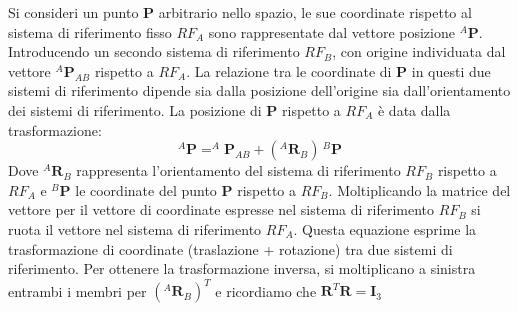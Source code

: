 \documentclass[11pt, a4paper]{report}
\begin{document}
\begin{center}
\end{center}
Si consideri un punto \textbf{P} arbitrario nello spazio, le sue coordinate rispetto al sistema di riferimento fisso $RF_{A}$ sono  rappresentate dal vettore posizione $^{A}\mathbf{P}$. Introducendo un secondo sistema di riferimento $RF_{B}$, con origine individuata dal vettore $^{A}\mathbf{P}_{AB}$ rispetto a $RF_{A}$. La relazione tra le coordinate di \textbf{P} in questi due sistemi di riferimento dipende sia dalla posizione dell'origine sia dall'orientamento dei sistemi di riferimento. La posizione di \textbf{P} rispetto a $RF_{A}$ è data dalla trasformazione:
\[
    ^{A}\mathbf{P} = ^{A}\mathbf{P}_{AB} + ({}^{A}\mathbf{R}_{B}) \, {}^{B}\mathbf{P}
\]
Dove ${}^{A}\mathbf{R}_{B}$ rappresenta l'orientamento del sistema di riferimento $RF_{B}$ rispetto a $RF_{A}$ e ${}^{B}\mathbf{P}$ le coordinate del punto \textbf{P} rispetto a $RF_{B}$. Moltiplicando la matrice del vettore per il vettore di coordinate espresse nel sistema di riferimento $RF_B$ si ruota il vettore nel sistema di riferimento $RF_{A}$. Questa equazione esprime la trasformazione di coordinate (traslazione + rotazione) tra due sistemi di riferimento. Per ottenere la trasformazione inversa, si moltiplicano a sinistra entrambi i membri per $(^{A}\mathbf{R}_{B})^T$ e ricordiamo che $\mathbf{R}^T \mathbf{R} = \mathbf{I}_3$
\end{document}
